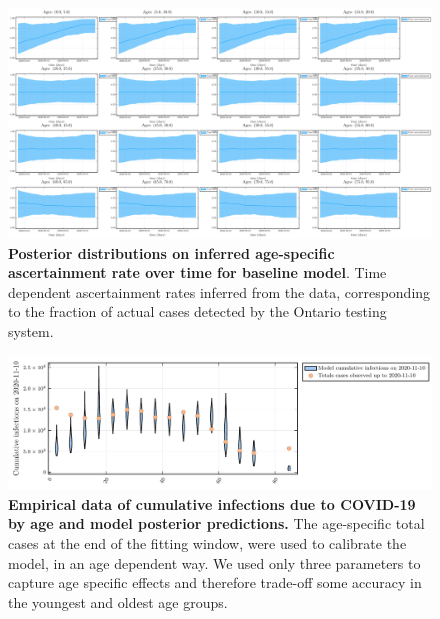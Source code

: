     \begin{figure}[H]
    \centering
    \includegraphics[width = 18 cm]{appendices/FigureS3.pdf}
    \caption[Posterior distributions on inferred age-specific ascertainment rate over time for baseline model.]{\textbf{Posterior distributions on inferred age-specific ascertainment rate over time for baseline model}. Time dependent ascertainment rates inferred from the data, corresponding to the fraction of actual cases detected by the Ontario testing system. }
    \label{s3}
    \end{figure}
    
    \clearpage 
    
    \begin{figure}[H]
    \centering
    \includegraphics[width = 12 cm]{appendices/FigureS4.pdf}
    \caption[Empirical data of cumulative infections due to COVID-19 by age and model posterior predictions.]{\textbf{Empirical data of cumulative infections due to COVID-19 by age and model posterior predictions.} The age-specific total cases at the end of the fitting window, were used to calibrate the model, in an age dependent way. We used only three parameters to capture age specific effects and therefore trade-off some accuracy in the youngest and oldest age groups.}
    \label{s4}
    \end{figure}
    
    \clearpage 
    

